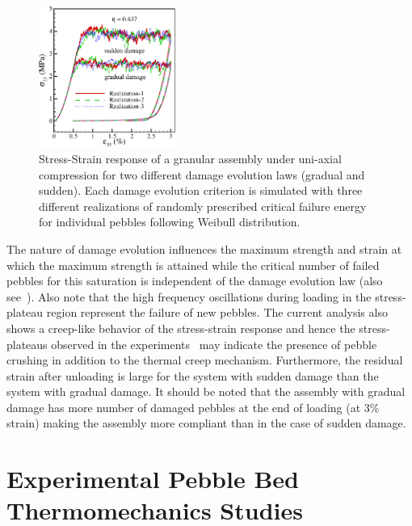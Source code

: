 \begin{figure}[!h]
\begin{center}
\includegraphics[width=0.4\textwidth]{chapters/figures/Fig-5}
\end{center}
\caption{Stress-Strain response of a granular assembly under uni-axial compression for two different damage evolution laws (gradual and sudden). Each damage evolution criterion is simulated with three different realizations of randomly prescribed critical failure energy for individual pebbles following Weibull distribution.}
\label{fig:stress-strain-effect}
\end{figure}

The nature of damage evolution influences the maximum strength and strain at which the maximum strength is attained while the critical number of failed pebbles for this saturation is independent of the damage evolution law (also see~\cite{Zhao2010}). Also note that the high frequency oscillations during loading in the stress-plateau region represent the failure of new pebbles. The current analysis also shows a creep-like behavior of the stress-strain response and hence the stress-plateaus observed in the experiments~\cite{Reimann:2000tw} may indicate the presence of pebble crushing in addition to the thermal creep mechanism. Furthermore, the residual strain after unloading is large for the system with sudden damage than the system with gradual damage. It should be noted that the assembly with gradual damage has more number of damaged pebbles at the end of loading (at 3\% strain) making the assembly more compliant than in the case of sudden damage. 












\section{Experimental Pebble Bed Thermomechanics Studies}
